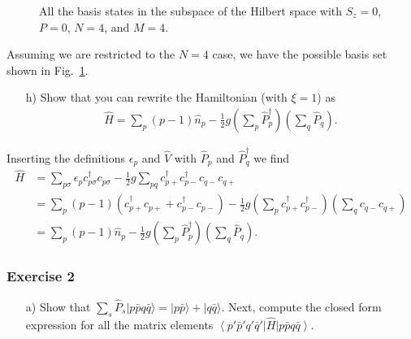 \documentclass[a4paper]{article}
\newcommand{\fig}[1]{Fig.\ \ref{fig:#1}}
\newcommand{\nn}{\nonumber}
\renewcommand{\i}{\hat{\imath}}
\newcommand{\ps}{{p\sigma}}
\newcommand{\cpp}{c_{p+}}
\newcommand{\cppd}{c_{p+}^\dagger}
\newcommand{\cpm}{c_{p-}}
\newcommand{\cpmd}{c_{p-}^\dagger}
\newcommand{\cqp}{c_{q+}}
\newcommand{\cqm}{c_{q-}}
\begin{document}
\begin{figure}
\begin{center}
\end{center}
\caption{All the basis states in the subspace of the Hilbert space with $S_z=0$, $P=0$, $N=4$, and $M=4$. \label{fig:2}}
\end{figure}
Assuming we are restricted to the $N=4$ case, we have the possible basis set shown in \fig{2}.


\begin{exframe}
\begin{itemize}
  \item[h)] Show that you can rewrite the Hamiltonian (with $\xi=1$) as 
  \begin{align}
  \hat H = \sum_p (p-1)\hat n_p - \frac{1}{2}g \left( \sum_p \hat P^\dagger_p \right) \left( \sum_q \hat P_q  \right).
  \end{align}
\end{itemize}
\end{exframe}
Inserting the definitions $\epsilon_p$ and $\hat V$ with $\hat P_p$ and $\hat P^\dagger_q$ we find
\begin{align}
\hat H &= \sum_\ps \epsilon_p c_\ps^\dagger c_\ps - \frac{1}{2}g \sum_{pq} \cppd \cpmd \cqm \cqp \nn\\
%
&= \sum_p (p-1) \left(\cppd \cpp + \cpmd \cpm \right) - \frac{1}{2}g \left(\sum_p\cppd \cpmd \right) \left( \sum_q \cqm \cqp \right) \nn\\
%
&= \sum_p (p-1) \hat n_p - \frac{1}{2}g \left(\sum_p\hat P_p^\dagger\right) \left( \sum_q \hat P_q\right).
\end{align}


\subsubsection{Exercise 2}
\begin{exframe}
\begin{itemize}
  \item[a)] Show that $\sum_s \hat P_s |p\bar p q \bar q\rangle = |p\bar p\rangle + |q \bar q\rangle$. Next, compute the closed form expression for all the matrix elements $\left\langle p'\bar p' q' \bar q' \right|\hat H \left|p\bar p q \bar q \right\rangle$.
\end{itemize}
\end{exframe}
\end{document}
